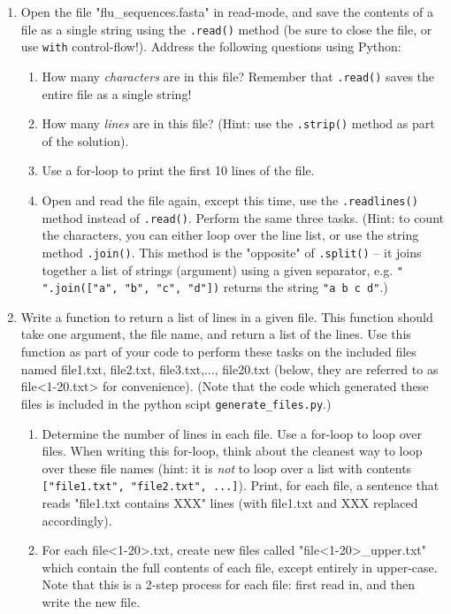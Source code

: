 \documentclass{article}[12pt]
\newcommand{\code}[1]{\texttt{#1}}  %
\begin{document}
\begin{enumerate}[itemsep=5ex]

	\item Open the file "flu\_sequences.fasta" in read-mode, and save the contents of a file as a single string using the \code{.read()} method (be sure to close the file, or use \code{with} control-flow!). Address the following questions using Python:
	
	\begin{enumerate}[itemsep=2ex]
		\item How many \emph{characters} are in this file? Remember that \code{.read()} saves the entire file as a single string!
		\item How many \emph{lines} are in this file? (Hint: use the \code{.strip()} method as part of the solution).
		\item Use a for-loop to print the first 10 lines of the file.
		\item Open and read the file again, except this time, use the \code{.readlines()} method instead of \code{.read()}. Perform the same three tasks. (Hint: to count the characters, you can either loop over the line list, or use the string method \code{.join()}. This method is the "opposite" of \code{.split()} -- it joins together a list of strings (argument) using a given separator, e.g. \code{" ".join(["a", "b", "c", "d"])} returns the string \code{"a b c d"}.)
	\end{enumerate}
	
	\item Write a function to return a list of lines in a given file. This function should take one argument, the file name, and return a list of the lines. Use this function as part of your code to perform these tasks on the included files named file1.txt, file2.txt, file3.txt,..., file20.txt (below, they are referred to as file<1-20.txt> for convenience). (Note that the code which generated these files is included in the python scipt \code{generate\_files.py}.)
		\begin{enumerate}[itemsep=2ex]
			\item Determine the number of lines in each file. Use a for-loop to loop over files. When writing this for-loop, think about the cleanest way to loop over these file names (hint: it is \emph{not} to loop over a list with contents \code{["file1.txt", "file2.txt", ...]}). Print, for each file, a sentence that reads "file1.txt contains XXX" lines (with file1.txt and XXX replaced accordingly).
			\item For each file<1-20>.txt, create new files called "file<1-20>\_upper.txt" which contain the full contents of each file, except entirely in upper-case. Note that this is a 2-step process for each file: first read in, and then write the new file. 
		\end{enumerate}
	

\end{enumerate}
\end{document}
